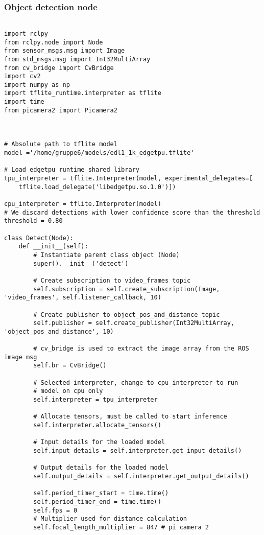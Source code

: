 \subsubsection{Object detection node}

\begin{lstlisting}[language=PythonPlus, basicstyle=\tiny,]

import rclpy
from rclpy.node import Node
from sensor_msgs.msg import Image
from std_msgs.msg import Int32MultiArray
from cv_bridge import CvBridge
import cv2
import numpy as np
import tflite_runtime.interpreter as tflite
import time
from picamera2 import Picamera2



# Absolute path to tflite model
model ='/home/gruppe6/models/edl1_1k_edgetpu.tflite'

# Load edgetpu runtime shared library
tpu_interpreter = tflite.Interpreter(model, experimental_delegates=[
    tflite.load_delegate('libedgetpu.so.1.0')])

cpu_interpreter = tflite.Interpreter(model)
# We discard detections with lower confidence score than the threshold
threshold = 0.80

class Detect(Node):
    def __init__(self):
        # Instantiate parent class object (Node)
        super().__init__('detect')

        # Create subscription to video_frames topic
        self.subscription = self.create_subscription(Image, 'video_frames', self.listener_callback, 10)

        # Create publisher to object_pos_and_distance topic
        self.publisher = self.create_publisher(Int32MultiArray, 'object_pos_and_distance', 10)

        # cv_bridge is used to extract the image array from the ROS image msg
        self.br = CvBridge()

        # Selected interpreter, change to cpu_interpreter to run
        # model on cpu only
        self.interpreter = tpu_interpreter

        # Allocate tensors, must be called to start inference
        self.interpreter.allocate_tensors()

        # Input details for the loaded model
        self.input_details = self.interpreter.get_input_details()

        # Output details for the loaded model
        self.output_details = self.interpreter.get_output_details()

        self.period_timer_start = time.time()
        self.period_timer_end = time.time()
        self.fps = 0
        # Multiplier used for distance calculation
        self.focal_length_multiplier = 847 # pi camera 2


\end{lstlisting}
